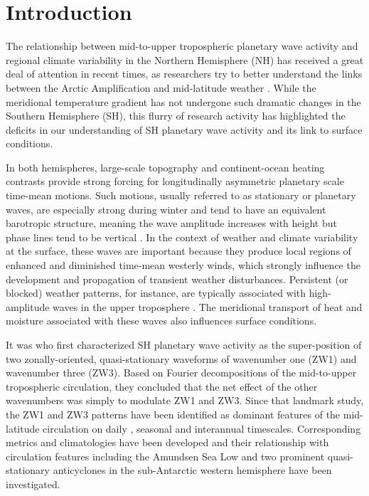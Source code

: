 \section{Introduction}\label{s:introduction}

The relationship between mid-to-upper tropospheric planetary wave activity and regional climate variability in the Northern Hemisphere (NH) has received a great deal of attention in recent times, as researchers try to better understand the links between the Arctic Amplification and mid-latitude weather \citep[e.g.][]{Cohen2014,Screen2014}. While the meridional temperature gradient has not undergone such dramatic changes in the Southern Hemisphere (SH), this flurry of research activity has highlighted the deficits in our understanding of SH planetary wave activity and its link to surface conditions. 

In both hemispheres, large-scale topography and continent-ocean heating contrasts provide strong forcing for longitudinally asymmetric planetary scale time-mean motions. Such motions, usually referred to as stationary or planetary waves, are especially strong during winter and tend to have an equivalent barotropic structure, meaning the wave amplitude increases with height but phase lines tend to be vertical \citep{Holton2013}. In the context of weather and climate variability at the surface, these waves are important because they produce local regions of enhanced and diminished time-mean westerly winds, which strongly influence the development and propagation of transient weather disturbances. Persistent (or blocked) weather patterns, for instance, are typically associated with high-amplitude waves in the upper troposphere \citep[e.g.][]{Trenberth1985,Renwick2005}. The meridional transport of heat and moisture associated with these waves also influences surface conditions. 

It was \citet{vanLoon1972} who first characterized SH planetary wave activity as the super-position of two zonally-oriented, quasi-stationary waveforms of wavenumber one (ZW1) and wavenumber three (ZW3). Based on Fourier decompositions of the mid-to-upper tropospheric circulation, they concluded that the net effect of the other wavenumbers was simply to modulate ZW1 and ZW3. Since that landmark study, the ZW1 and ZW3 patterns have been identified as dominant features of the mid-latitude circulation on daily \citep[e.g.][]{Kidson1988}, seasonal \citep[e.g.][]{Mo1985} and interannual \citep[e.g.][]{Karoly1989} timescales. Corresponding metrics and climatologies have been developed \citep{Raphael2004,Hobbs2007} and their relationship with circulation features including the Amundsen Sea Low \citep{Turner2013} and two prominent quasi-stationary anticyclones in the sub-Antarctic western hemisphere \citep{Hobbs2010} have been investigated.

